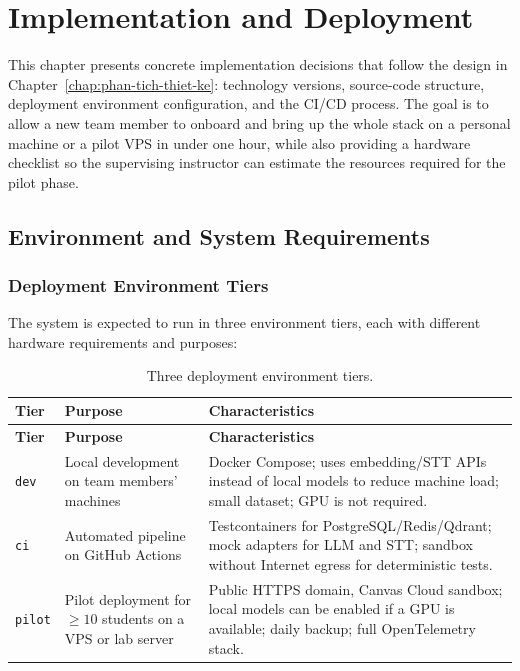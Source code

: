 \chapter{Implementation and Deployment}
\label{chap:hien-thuc-trien-khai}

This chapter presents concrete implementation decisions that follow the
design in Chapter~\ref{chap:phan-tich-thiet-ke}: technology versions,
source-code structure, deployment environment configuration, and the
CI/CD process. The goal is to allow a new team member to onboard and
bring up the whole stack on a personal machine or a pilot VPS in under
one hour, while also providing a hardware checklist so the supervising
instructor can estimate the resources required for the pilot phase.

\section{Environment and System Requirements}
\label{sec:environment-requirements}

\subsection{Deployment Environment Tiers}

The system is expected to run in three environment tiers, each with
different hardware requirements and purposes:

\begin{longtable}{|p{2cm}|p{3.2cm}|p{8.3cm}|}
\caption{Three deployment environment tiers.}
\label{tab:envs-c5} \\
\hline
\textbf{Tier} & \textbf{Purpose} & \textbf{Characteristics} \\
\hline
\endfirsthead
\hline
\textbf{Tier} & \textbf{Purpose} & \textbf{Characteristics} \\
\hline
\endhead

\texttt{dev}
    & Local development on team members' machines
    & Docker Compose; uses embedding/STT APIs instead of local models
      to reduce machine load; small dataset; GPU is not required. \\
\hline
\texttt{ci}
    & Automated pipeline on GitHub Actions
    & Testcontainers for PostgreSQL/Redis/Qdrant; mock adapters for
      LLM and STT; sandbox without Internet egress for deterministic
      tests. \\
\hline
\texttt{pilot}
    & Pilot deployment for $\geq 10$ students on a VPS or lab server
    & Public HTTPS domain, Canvas Cloud sandbox; local models can be
      enabled if a GPU is available; daily backup; full OpenTelemetry
      stack. \\
\hline
\end{longtable}

